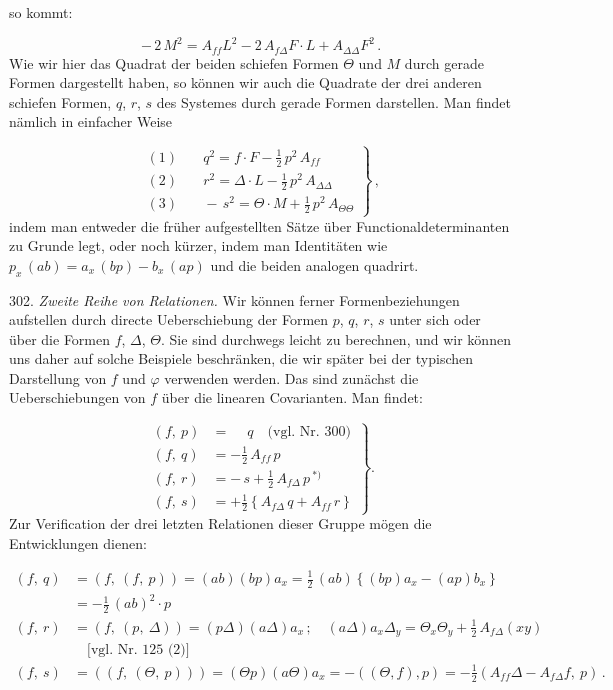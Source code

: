 \documentclass[11pt]{article}
\providecommand{\weberpage}[1]{}
\providecommand{\weq}[2]{\begin{equation}\tag{#1}#2\end{equation}}
\let\Delta\varDelta
\let\Theta\varTheta
\begin{document}
\weberpage{325}
so kommt:

\weq{III}{-\,2\,M^2 = A_{ff}L^2 - 2\,A_{f\Delta}F\cdot L + A_{\Delta\Delta}F^2\,.}
Wie wir hier das Quadrat der beiden schiefen Formen $\Theta$ und $M$ durch
gerade Formen dargestellt haben, so können wir auch die Quadrate der drei
anderen schiefen Formen, $q$, $r$, $s$ des Systemes durch gerade Formen
darstellen. Man findet nämlich in einfacher Weise

\weq{IV}{\left.\begin{aligned}
(1)&\quad q^2 = f\cdot F - \tfrac{1}{2}\,p^2\,A_{ff}\\[6pt]
(2)&\quad r^2 = \Delta\cdot L - \tfrac{1}{2}\,p^2\,A_{\Delta\Delta}\\[6pt]
(3)&\quad -\,s^2 = \Theta\cdot M + \tfrac{1}{2}\,p^2\,A_{\Theta\Theta}
\end{aligned}\right\}\,,}
indem man entweder die früher aufgestellten Sätze über
Functionaldeterminanten zu Grunde legt, oder noch kürzer, indem man
Identitäten wie $p_x\,(ab) = a_x\,(bp) - b_x\,(ap)$ und die beiden analogen
quadrirt.

302. \textit{Zweite Reihe von Relationen.} Wir können ferner
Formenbeziehungen aufstellen durch directe Ueberschiebung der Formen $p$,
$q$, $r$, $s$ unter sich oder über die Formen $f$, $\Delta$, $\Theta$. Sie
sind durchwegs leicht zu berechnen, und wir können uns daher auf solche
Beispiele beschränken, die wir später bei der typischen Darstellung von $f$
und $\varphi$ verwenden werden. Das sind zunächst die Ueberschiebungen von
$f$ über die linearen Covarianten. Man findet:

\weq{V}{\left.\begin{aligned}
(f,\ p) &= \phantom{-}q \quad \text{(vgl. Nr. 300)}\\[6pt]
(f,\ q) &= -\tfrac{1}{2}\,A_{ff}\,p\\[6pt]
(f,\ r) &= -\,s + \tfrac{1}{2}\,A_{f\Delta}\,p\,^{*)}\\[6pt]
(f,\ s) &= +\tfrac{1}{2}\left\{A_{f\Delta}\,q + A_{ff}\,r\right\}
\end{aligned}\right\}.}
Zur Verification der drei letzten Relationen dieser Gruppe mögen die
Entwicklungen dienen:

\[
\begin{aligned}
(f,\ q) &= (f,\ (f,\ p)) = (ab)(bp)a_x = \tfrac{1}{2}\,(ab)\left\{(bp)a_x -
(ap)b_x\right\}\\
&= -\tfrac{1}{2}\,(ab)^2\cdot p\\
(f,\ r) &= (f,\ (p,\ \Delta)) = (p\Delta)(a\Delta)a_x\,;\quad
(a\Delta)a_x\Delta_y = \Theta_x\Theta_y + \tfrac{1}{2}\,A_{f\Delta}(xy)\\
&\quad\text{[vgl. Nr. 125 (2)]}\\
(f,\ s) &= ((f,\ (\Theta,\ p))) = (\Theta p)(a\Theta)a_x = -((\Theta,f),p) =
-\tfrac{1}{2}(A_{ff}\Delta - A_{f\Delta}f,\ p)\,.
\end{aligned}
\]
\end{document}
